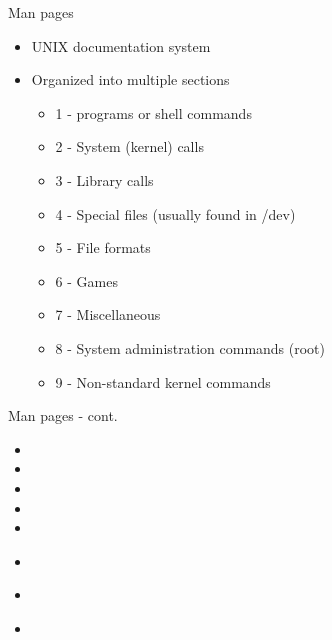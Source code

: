 \documentclass[t]{beamer}
\begin{document}
\begin{frame}{Man pages}
  \begin{itemize}
  \item UNIX documentation system
  \item Organized into multiple sections
    \begin{itemize}
    \item 1 - programs or shell commands
    \item 2 - System (kernel) calls
    \item 3 - Library calls
    \item 4 - Special files (usually found in /dev)
    \item 5 - File formats
    \item 6 - Games
    \item 7 - Miscellaneous
    \item 8 - System administration commands (root)
    \item 9 - Non-standard kernel commands
    \end{itemize}
  \end{itemize}
  \note{}
\end{frame}

\begin{frame}{Man pages - cont.}
  \begin{itemize}
  \item 
  \item 
  \item 
  \item 
  \item 
  \end{itemize}
  \note{}
\end{frame}

\begin{frame}{}
  \begin{itemize}
  \item 
  \end{itemize}
  \note{}
\end{frame}

\begin{frame}{}
  \begin{itemize}
  \item 
  \end{itemize}
  \note{}
\end{frame}

\begin{frame}{}
  \begin{itemize}
  \item 
  \end{itemize}
  \note{}
\end{frame}
\end{document}
